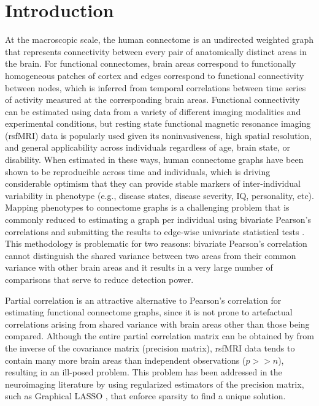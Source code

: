 \documentclass[useAMS,usenatbib,referee]{bio}
\begin{document}
\section{Introduction}

\iffalse
At the macroscopic scale, the human connectome is an undirected weighted graph that represents connectivity between every pair of anatomically distinct areas in the brain\cite{Craddock2013Connectomes}. For functional connectomes, brain areas correspond to functionally homogeneous patches of cortex and edges correspond to functional connectivity between nodes, which is inferred from temporal correlations between time series of activity measured at the corresponding brain areas\cite{Craddock2013Connectomes,Varoquaux2013}. Functional connectivity can be estimated using data from a variety of different imaging modalities and experimental conditions, but resting state functional magnetic resonance imaging (rsfMRI) data is popularly used given its noninvasiveness, high spatial resolution, and general applicability across individuals regardless of age, brain state, or disability\cite{Biswal1995}. When estimated in these ways, human connectome graphs have been shown to be reproducible across time\cite{shehzad2009} and individuals\cite{damasoix}, which is driving considerable optimism that they can provide stable markers of inter-individual variability in phenotype (e.g., disease states, disease severity, IQ, personality, etc). Mapping phenotypes to connectome graphs is a challenging problem that is commonly reduced to estimating a graph per individual using bivariate Pearson's correlations and submitting the results to edge-wise univariate statistical tests \cite{craddock2013connectome, varoquaux2013}. This methodology is problematic for two reasons: bivariate Pearson's correlation cannot distinguish the shared variance between two areas from their common variance with other brain areas and it results in a very large number of comparisons that serve to reduce detection power. 

Partial correlation is an attractive alternative to Pearson's correlation for estimating functional connectome graphs, since it is not prone to artefactual correlations arising from shared variance with brain areas other than those being compared\cite{Varoquaux2013}. Although the entire partial correlation matrix can be obtained by from the inverse of the covariance matrix (precision matrix), rsfMRI data tends to contain many more brain areas than independent observations ($p >> n$), resulting in an ill-posed problem. This problem has been addressed in the neuroimaging literature by using regularized estimators of the precision matrix, such as Graphical LASSO \citep{Meinshausen:2006,Yuan:2007,Rothman:2008}, that enforce sparsity to find a unique solution.  
\end{document}

